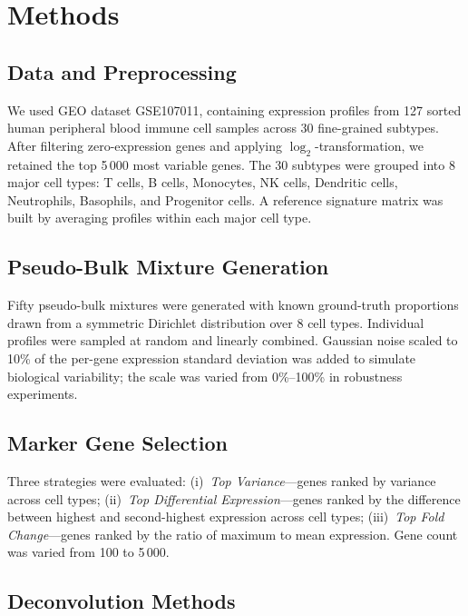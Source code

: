 \documentclass[10pt,twocolumn]{article}
\begin{document}
\section{Methods}

\subsection{Data and Preprocessing}

We used GEO dataset GSE107011, containing expression profiles from 127 sorted
human peripheral blood immune cell samples across 30 fine-grained subtypes.
After filtering zero-expression genes and applying $\log_2$-transformation,
we retained the top 5\,000 most variable genes. The 30 subtypes were grouped
into 8 major cell types: T cells, B cells, Monocytes, NK cells, Dendritic
cells, Neutrophils, Basophils, and Progenitor cells. A reference signature
matrix was built by averaging profiles within each major cell type.

\subsection{Pseudo-Bulk Mixture Generation}

Fifty pseudo-bulk mixtures were generated with known ground-truth proportions
drawn from a symmetric Dirichlet distribution over 8 cell types. Individual
profiles were sampled at random and linearly combined. Gaussian noise scaled
to 10\% of the per-gene expression standard deviation was added to simulate
biological variability; the scale was varied from 0\%--100\% in robustness
experiments.

\subsection{Marker Gene Selection}

Three strategies were evaluated: (i)~\textit{Top Variance}---genes ranked by
variance across cell types; (ii)~\textit{Top Differential
Expression}---genes ranked by the difference between highest and
second-highest expression across cell types; (iii)~\textit{Top Fold
Change}---genes ranked by the ratio of maximum to mean expression. Gene count
was varied from 100 to 5\,000.

\subsection{Deconvolution Methods}
\end{document}
